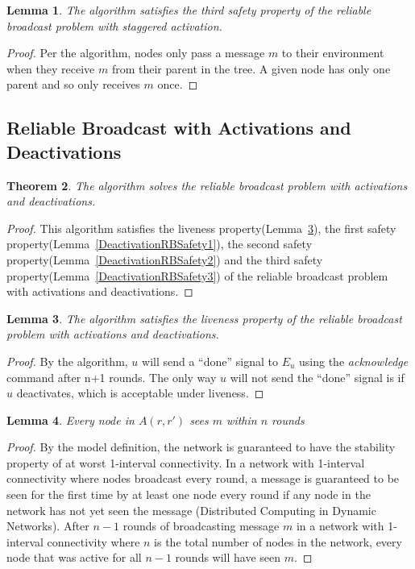 \documentclass[english]{article}
\newtheorem{theorem}{Theorem}[section]
\newtheorem{lemma}[theorem]{Lemma}
\begin{document}
\begin{lemma}
\label{StaggeredRBSafety3}
The algorithm satisfies the third safety property of the reliable broadcast problem with staggered activation.
\end{lemma}
\begin{proof}

Per the algorithm, nodes only pass a message $m$ to their environment when they receive $m$ from their parent in the tree. A given node has only one parent and so only receives $m$ once.

\end{proof}



\subsection {Reliable Broadcast with Activations and Deactivations}

\begin{theorem}
\label{DeactivationReliableBroadcast}
The algorithm solves the reliable broadcast problem with activations and deactivations.
\end{theorem}
\begin{proof}
This algorithm satisfies the liveness property(Lemma~\ref{DeactivationRBLiveness}), 
the first safety property(Lemma~\ref{DeactivationRBSafety1}),
the second safety property(Lemma~\ref{DeactivationRBSafety2}) and 
the third safety property(Lemma~\ref{DeactivationRBSafety3}) of the reliable broadcast problem with activations and deactivations.
\end{proof}

\begin{lemma}
\label{DeactivationRBLiveness}
The algorithm satisfies the liveness property of the reliable broadcast problem with activations and deactivations.
\end{lemma}
\begin{proof}

By the algorithm, $u$ will send  a ``done'' signal to $E_u$ using the \textit{acknowledge} command after n+1 rounds. The only way $u$ will not send the ``done'' signal is if $u$ deactivates, which is acceptable under liveness.
\end{proof}

\begin{lemma}
\label{RBDeactivationReceive}
Every node in $A(r,r')$ sees $m$ within $n$ rounds
\end{lemma}
\begin{proof}

By the model definition, the network is guaranteed to have the stability property of at worst 1-interval connectivity. In a network with 1-interval connectivity where nodes broadcast every round, a message is guaranteed to be seen for the first time by at least one node every round if any node in the network has not yet seen the message (Distributed Computing in Dynamic Networks). After $n-1$ rounds of broadcasting message $m$ in a network with 1-interval connectivity where $n$ is the total number of nodes in the network, every node that was active for all $n-1$ rounds will have seen $m$.

\end{proof}
\end{document}
